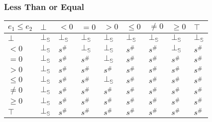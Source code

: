 \documentclass{beamer}
\begin{document}
                        \begin{frame}
                            \frametitle{Less Than or Equal}
                        \begin{table}[]
                            \begin{tabular}{|l|l|l|l|l|l|l|l|l|}
                            \hline
                            $e_1 \le e_2$ & $\bot$ & $<0$   & $=0$   & $>0$   & $\le 0$ & $\ne 0$ & $\ge 0$ & $\top$ \\ \hline
                            $\bot$        & $\bot_\mathbb{S}$ & $\bot_\mathbb{S}$ & $\bot_\mathbb{S}$ & $\bot_\mathbb{S}$ & $\bot_\mathbb{S}$  & $\bot_\mathbb{S}$  & $\bot_\mathbb{S}$  & $\bot_\mathbb{S}$ \\ \hline
                            $<0$          & $\bot_\mathbb{S}$ & $s^\#$ & $\bot_\mathbb{S}$ & $\bot_\mathbb{S}$ & $s^\#$  & $s^\#$  & $\bot_\mathbb{S}$  & $s^\#$ \\ \hline
                            $=0$          & $\bot_\mathbb{S}$ & $s^\#$ & $s^\#$ & $\bot_\mathbb{S}$ & $s^\#$  & $s^\#$  & $s^\#$  & $s^\#$ \\ \hline
                            $>0$          & $\bot_\mathbb{S}$ & $s^\#$ & $s^\#$ & $s^\#$ & $s^\#$  & $s^\#$  & $s^\#$  & $s^\#$ \\ \hline
                            $\le 0$       & $\bot_\mathbb{S}$ & $s^\#$ & $s^\#$ & $\bot_\mathbb{S}$ & $s^\#$  & $s^\#$  & $s^\#$  & $s^\#$ \\ \hline
                            $\ne 0$       & $\bot_\mathbb{S}$ & $s^\#$ & $s^\#$ & $s^\#$ & $s^\#$  & $s^\#$  & $s^\#$  & $s^\#$ \\ \hline
                            $\ge 0$       & $\bot_\mathbb{S}$ & $s^\#$ & $s^\#$ & $s^\#$ & $s^\#$  & $s^\#$  & $s^\#$  & $s^\#$ \\ \hline
                            $\top$        & $\bot_\mathbb{S}$ & $s^\#$ & $s^\#$ & $s^\#$ & $s^\#$  & $s^\#$  & $s^\#$  & $s^\#$ \\ \hline
                            \end{tabular}
                            \end{table}
                        \end{frame}
\end{document}
